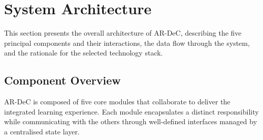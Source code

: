 
\section{System Architecture}
\label{sec:architecture}

This section presents the overall architecture of AR-DeC, describing the five principal components and their interactions, the data flow through the system, and the rationale for the selected technology stack.

\subsection{Component Overview}
\label{subsec:components}

AR-DeC is composed of five core modules that collaborate to deliver the integrated learning experience. Each module encapsulates a distinct responsibility while communicating with the others through well-defined interfaces managed by a centralised state layer.

